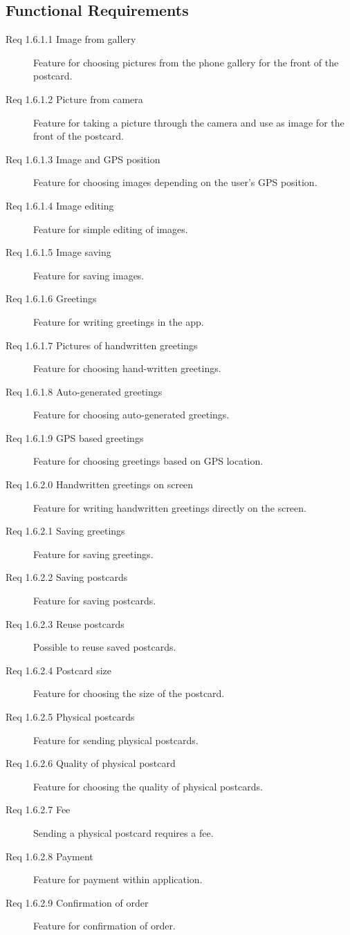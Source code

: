 \documentclass[10pt,a4paper]{article}
\begin{document}
\subsection{Functional Requirements}
\begin {description}
\item [Req 1.6.1.1 Image from gallery] Feature for choosing pictures from the phone gallery for the front of the postcard.
\item [Req 1.6.1.2 Picture from camera] Feature for taking a picture through the camera and use as image for the front of the postcard.
\item [Req 1.6.1.3 Image and GPS position] Feature for choosing images depending on the user's GPS position.
\item [Req 1.6.1.4 Image editing] Feature for simple editing of images.
\item [Req 1.6.1.5 Image saving] Feature for saving images.
\item [Req 1.6.1.6 Greetings] Feature for writing greetings in the app.
\item [Req 1.6.1.7 Pictures of handwritten greetings] Feature for choosing hand-written greetings.
\item [Req 1.6.1.8 Auto-generated greetings] Feature for choosing auto-generated greetings.
\item [Req 1.6.1.9 GPS based greetings] Feature for choosing greetings based on GPS location.
\item [Req 1.6.2.0 Handwritten greetings on screen] Feature for writing handwritten greetings directly on the screen.
\item [Req 1.6.2.1 Saving greetings] Feature for saving greetings.
\item [Req 1.6.2.2 Saving postcards] Feature for saving postcards.
\item [Req 1.6.2.3 Reuse postcards] Possible to reuse saved postcards.
\item [Req 1.6.2.4 Postcard size] Feature for choosing the size of the postcard.
\item [Req 1.6.2.5 Physical postcards] Feature for sending physical postcards.
\item [Req 1.6.2.6 Quality of physical postcard] Feature for choosing the quality of physical postcards. 
\item [Req 1.6.2.7 Fee] Sending a physical postcard requires a fee.
\item [Req 1.6.2.8 Payment] Feature for payment within application.
\item [Req 1.6.2.9 Confirmation of order] Feature for confirmation of order.

\end{description}
\end{document}
